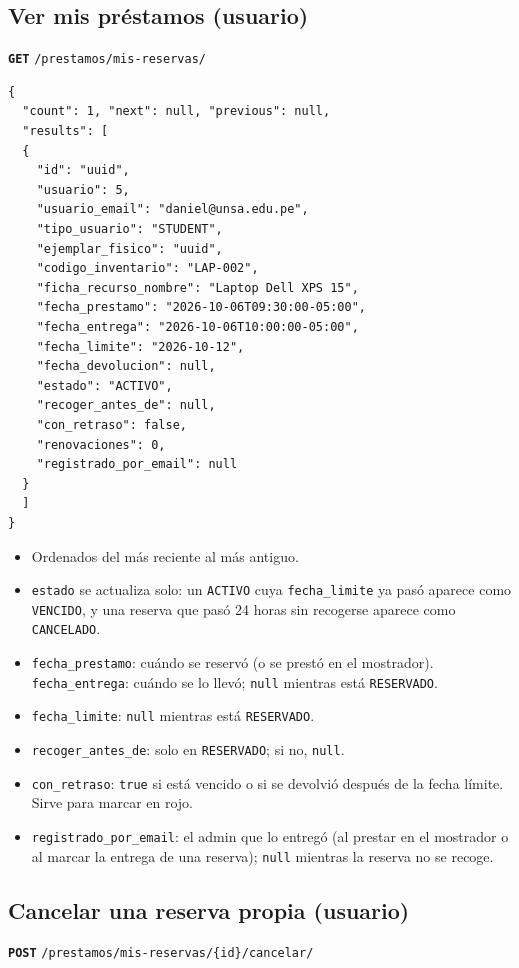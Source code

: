\documentclass[11pt]{article}
\newcommand{\us}{\_\allowbreak}
\newcommand{\metodo}[2]{\textbf{\texttt{#1}} \texttt{#2}}
\begin{document}
\subsection*{Ver mis pr\'estamos (usuario)}
\metodo{GET}{/prestamos/mis-reservas/}
\begin{lstlisting}
{
  "count": 1, "next": null, "previous": null,
  "results": [
  {
    "id": "uuid",
    "usuario": 5,
    "usuario_email": "daniel@unsa.edu.pe",
    "tipo_usuario": "STUDENT",
    "ejemplar_fisico": "uuid",
    "codigo_inventario": "LAP-002",
    "ficha_recurso_nombre": "Laptop Dell XPS 15",
    "fecha_prestamo": "2026-10-06T09:30:00-05:00",
    "fecha_entrega": "2026-10-06T10:00:00-05:00",
    "fecha_limite": "2026-10-12",
    "fecha_devolucion": null,
    "estado": "ACTIVO",
    "recoger_antes_de": null,
    "con_retraso": false,
    "renovaciones": 0,
    "registrado_por_email": null
  }
  ]
}
\end{lstlisting}
\begin{itemize}
    \item Ordenados del m\'as reciente al m\'as antiguo.
    \item \texttt{estado} se actualiza solo: un \texttt{ACTIVO} cuya \texttt{fecha\us limite} ya pas\'o aparece como \texttt{VENCIDO}, y una reserva que pas\'o 24 horas sin recogerse aparece como \texttt{CANCELADO}.
    \item \texttt{fecha\us prestamo}: cu\'ando se reserv\'o (o se prest\'o en el mostrador). \texttt{fecha\us entrega}: cu\'ando se lo llev\'o; \texttt{null} mientras est\'a \texttt{RESERVADO}.
    \item \texttt{fecha\us limite}: \texttt{null} mientras est\'a \texttt{RESERVADO}.
    \item \texttt{recoger\us antes\us de}: solo en \texttt{RESERVADO}; si no, \texttt{null}.
    \item \texttt{con\us retraso}: \texttt{true} si est\'a vencido o si se devolvi\'o despu\'es de la fecha l\'imite. Sirve para marcar en rojo.
    \item \texttt{registrado\us por\us email}: el admin que lo entreg\'o (al prestar en el mostrador o al marcar la entrega de una reserva); \texttt{null} mientras la reserva no se recoge.
\end{itemize}

\subsection*{Cancelar una reserva propia (usuario)}
\metodo{POST}{/prestamos/mis-reservas/\{id\}/cancelar/}
\end{document}
